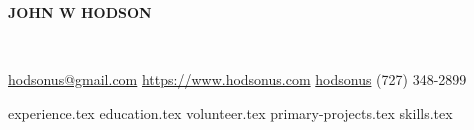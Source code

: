 \documentclass[11pt]{article}
\newcommand*{\sectiondir}{sections/}
\newcommand*{\headerspace}{\vspace{.05cm}}
\begin{document}
	\noindent\centerline{ \huge\textbf{JOHN W HODSON}}\\
	\headerspace

	\noindent
	\faEnvelopeSquare \space\href{mailto:hodsonus@gmail.com}{hodsonus@gmail.com} \hspace*{\fill}
	\faHome \space \href{https://www.hodsonus.com}{https://www.hodsonus.com} \hspace*{\fill}
	\faGithub \space \href{https://github.com/hodsonus}{hodsonus} \hspace*{\fill}
	\faMobilePhone \space (727) 348-2899\\
	\headerspace

	{experience.tex}
	{education.tex}
	{volunteer.tex}
	{primary-projects.tex}
	{skills.tex}
\end{document}
